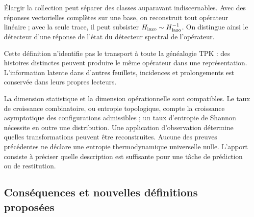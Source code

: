 Élargir la collection peut séparer des classes auparavant indiscernables.
Avec des réponses vectorielles complètes sur une base, on reconstruit tout
opérateur linéaire ; avec la seule trace, il peut subsister
\(H_{\rm lazo}\sim H_{\rm lazo}^{-1}\).
On distingue ainsi le détecteur d’une réponse de l’état du détecteur
spectral de l’opérateur.

Cette définition n’identifie pas le transport à toute la généalogie
TPK : des histoires distinctes peuvent produire le même opérateur dans une
représentation. L’information latente dans d’autres feuillets, incidences et
prolongements est conservée dans leurs propres lecteurs.

La dimension statistique et la dimension opérationnelle sont compatibles.
Le taux de croissance combinatoire, ou entropie topologique, compte
la croissance asymptotique des configurations admissibles ; un taux
d’entropie de Shannon nécessite en outre une distribution.
Une application d’observation détermine quelles transformations peuvent
être reconstruites. Aucune des preuves précédentes ne déclare une entropie
thermodynamique universelle nulle. L’apport consiste à préciser quelle description
est suffisante pour une tâche de prédiction ou de restitution.

\subsection{Conséquences et nouvelles définitions proposées}
\label{md:comp:consecuencias}

